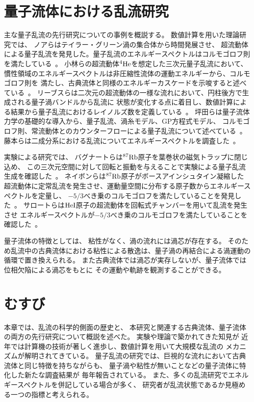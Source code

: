 \documentclass[12pt,a4paper]{jbook}
\begin{document}
		\section{量子流体における乱流研究}
		主な量子乱流の先行研究についての事例を概説する。
        数値計算を用いた理論研究では、
        ノアらはテイラー・グリーン渦の集合体から時間発展させ、
        超流動体による量子乱流を発見した。量子乱流のエネルギースペクトルはコルモゴロフ則を満たしている~\cite{Nore}。
        小林らの超流動体$\rm{^4He}$を想定した三次元量子乱流において、
        慣性領域のエネルギースペクトルは非圧縮性流体の運動エネルギーから、コルモゴロフ則を
        満たし、古典流体と同様のエネルギーカスケードを示唆すると述べている~\cite{Kobayashi}。
        リーブスらは二次元の超流動体の一様な流れにおいて、円柱後方で生成される量子渦バンドルから乱流に
        状態が変化する点に着目し、数値計算による結果から量子乱流におけるレイノルズ数を定義している~\cite{Reeves1}。
		坪田らは量子流体力学の基礎的な導入から、量子乱流、渦糸モデル、GP方程式モデル、
        コルモゴロフ則、常流動体とのカウンターフローによる量子乱流について述べている~\cite{butsuri2, Tsubota3}。
		藤本らは二成分系における乱流についてエネルギースペクトルを調査した~\cite{Fujimoto}。

        実験による研究では、
        バグナートらは$\rm{^{87}Rb}$原子を葉巻状の磁気トラップに閉じ込め、
        この三次元空間に対して回転と振動を与えることで実験による量子乱流生成を確認した~\cite{Bagnato}。
        ネイボンらは$\rm{^{87}Rb}$原子がボースアインシュタイン凝縮した
        超流動体に定常乱流を発生させ、運動量空間に分布する原子数からエネルギースペクトルを定量し、
        $-5/3$べき乗のコルモゴロフを満たしていることを発見した~\cite{Navon}。
        サロートらは$\rm{He I}$原子の超流動体を回転式チャンバーを用いて乱流を発生させ
        エネルギースペクトルが$-5/3$べき乗のコルモゴロフを満たしていることを確認した~\cite{Salort}。

		量子流体の特徴としては、
		粘性がなく、渦の流れには渦芯が存在する。
		そのため乱流中の古典流体における粘性による散逸は、量子渦の再結合による渦運動の循環で置き換えられる。
		また古典流体では渦芯が実存しないが、量子流体では位相欠陥による渦芯をもとに
		その運動や軌跡を観測することができる。


		\section{むすび}
        本章では、乱流の科学的側面の歴史と、
        本研究と関連する古典流体、量子流体の両方の先行研究について概説を述べた。
        実験や理論で築かれてきた知見が
        近年では計算機の技術が著しく進歩し、数値計算を用いて大規模な乱流の
        メカニズムが解明されてきている。
        量子乱流の研究では、巨視的な流れにおいて古典流体と同じ特徴を持ちながらも、
        量子渦や粘性が無いことなどの量子流体に特化した新たな調査結果が
        毎年報告されている。
        また、多くの乱流研究でエネルギースペクトルを併記している場合が多く、
        研究者が乱流状態であるか見極める一つの指標と考えられる。
\end{document}
